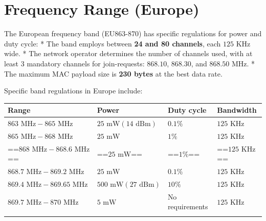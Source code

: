 \documentclass[a4paper, 12pt]{book} %
\begin{document}
\section{Frequency Range (Europe)}\label{frequency-range-europe}

The European frequency band (EU863-870) has specific regulations for
power and duty cycle: * The band employs between \textbf{24 and 80
channels}, each \(125 \text{ KHz}\) wide. * The network operator
determines the number of channels used, with at least 3 mandatory
channels for join-requests: \(868.10\), \(868.30\), and
\(868.50 \text{ MHz}\). * The maximum MAC payload size is \textbf{230
bytes} at the best data rate.

Specific band regulations in Europe include:

\begin{longtable}[]{@{}
  >{\raggedright\arraybackslash}p{}
  >{\raggedright\arraybackslash}p{}
  >{\raggedright\arraybackslash}p{}
  >{\raggedright\arraybackslash}p{}@{}}
\toprule\noalign{}
\begin{minipage}[b]{\linewidth}\raggedright
Range
\end{minipage} & \begin{minipage}[b]{\linewidth}\raggedright
Power
\end{minipage} & \begin{minipage}[b]{\linewidth}\raggedright
Duty cycle
\end{minipage} & \begin{minipage}[b]{\linewidth}\raggedright
Bandwidth
\end{minipage} \\
\midrule\noalign{}
\endhead
\bottomrule\noalign{}
\endlastfoot
\(863 \text{ MHz} - 865 \text{ MHz}\) &
\(25 \text{ mW} (14 \text{ dBm})\) & \(0.1\%\) & \(125 \text{ KHz}\) \\
\(865 \text{ MHz} - 868 \text{ MHz}\) & \(25 \text{ mW}\) & \(1\%\) &
\(125 \text{ KHz}\) \\
==\(868 \text{ MHz} - 868.6 \text{ MHz}\)== & ==\(25 \text{ mW}\)== &
==\(1\%\)== & ==\(125 \text{ KHz}\)== \\
\(868.7 \text{ MHz} - 869.2 \text{ MHz}\) & \(25 \text{ mW}\) &
\(0.1\%\) & \(125 \text{ KHz}\) \\
\(869.4 \text{ MHz} - 869.65 \text{ MHz}\) &
\(500 \text{ mW} (27 \text{ dBm})\) & \(10\%\) & \(125 \text{ KHz}\) \\
\(869.7 \text{ MHz} - 870 \text{ MHz}\) & \(5 \text{ mW}\) & No
requirements & \(125 \text{ KHz}\) \\
& & & \\
\end{longtable}
\end{document}
